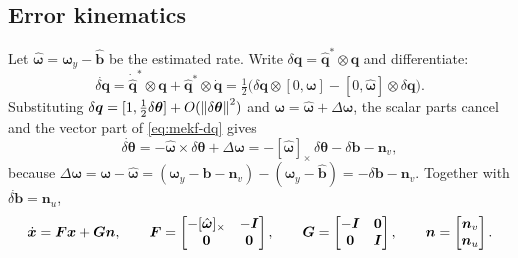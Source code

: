\subsection{Error kinematics}
Let $\hat{\bm{\omega}}=\bm{\omega}_y-\hat{\bm{b}}$ be the estimated rate. Write
$\delta\bm{q}=\hat{\bm{q}}^*\otimes\bm{q}$ and differentiate:
\begin{equation}
\dot{\delta\bm{q}} = \dot{\hat{\bm{q}}}^*\otimes\bm{q} + \hat{\bm{q}}^*\otimes\dot{\bm{q}}
 = \tfrac12\big(\delta\bm{q}\otimes[0,\bm{\omega}] - [0,\hat{\bm{\omega}}]\otimes\delta\bm{q}\big).
\label{eq:mekf-dq}
\end{equation}
Substituting $\delta\bm{q}=[1,\tfrac12\delta\bm{\theta}]+O(\left\lVert \delta\bm{\theta} \right\rVert^2)$ and
$\bm{\omega}=\hat{\bm{\omega}}+\Delta\bm{\omega}$, the scalar parts cancel and the vector part of
\eqref{eq:mekf-dq} gives
\begin{equation}
\dot{\delta\bm{\theta}} = -\hat{\bm{\omega}}\times\delta\bm{\theta} + \Delta\bm{\omega}
 = -[\hat{\bm{\omega}}]_\times\,\delta\bm{\theta} - \delta\bm{b} - \bm{n}_v ,
\label{eq:mekf-dtheta}
\end{equation}
because $\Delta\bm{\omega}=\bm{\omega}-\hat{\bm{\omega}}
=(\bm{\omega}_y-\bm{b}-\bm{n}_v)-(\bm{\omega}_y-\hat{\bm{b}})=-\delta\bm{b}-\bm{n}_v$. Together with
$\dot{\delta\bm{b}}=\bm{n}_u$,
\begin{equation}
\dot{\bm{x}} = \bm{F}\bm{x} + \bm{G}\bm{n},\qquad
\bm{F}=\begin{bmatrix}-[\hat{\bm{\omega}}]_\times & -\bm{I}\\ \bm{0}&\bm{0}\end{bmatrix},\qquad
\bm{G}=\begin{bmatrix}-\bm{I}&\bm{0}\\ \bm{0}&\bm{I}\end{bmatrix},\qquad
\bm{n}=\begin{bmatrix}\bm{n}_v\\ \bm{n}_u\end{bmatrix}.
\label{eq:mekf-F}
\end{equation}

